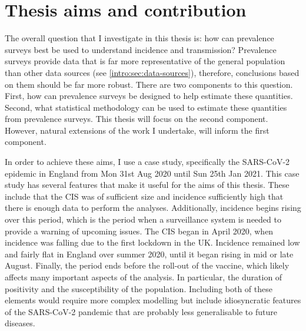 \documentclass[thesis.tex]{subfiles}
\begin{document}


\section{Thesis aims and contribution} \label{intro:sec:aims}

The overall question that I investigate in this thesis is: how can prevalence surveys best be used to understand incidence and transmission?
Prevalence surveys provide data that is far more representative of the general population than other data sources (see \cref{intro:sec:data-sources}), therefore, conclusions based on them should be far more robust.
There are two components to this question.
First, how can prevalence surveys be designed to help estimate these quantities.
Second, what statistical methodology can be used to estimate these quantities from prevalence surveys.
This thesis will focus on the second component.
However, natural extensions of the work I undertake, will inform the first component.

In order to achieve these aims, I use a case study, specifically the SARS-CoV-2 epidemic in England from Mon 31st Aug 2020 until Sun 25th Jan 2021.
This case study has several features that make it useful for the aims of this thesis.
These include that the CIS was of sufficient size and incidence sufficiently high that there is enough data to perform the analyses.
Additionally, incidence begins rising over this period, which is the period when a surveillance system is needed to provide a warning of upcoming issues.
The CIS began in April 2020, when incidence was falling due to the first lockdown in the UK.
Incidence remained low and fairly flat in England over summer 2020, until it began rising in mid or late August.
Finally, the period ends before the roll-out of the vaccine, which likely affects many important aspects of the analysis.
In particular, the duration of positivity and the susceptibility of the population.
Including both of these elements would require more complex modelling but include idiosyncratic features of the SARS-CoV-2 pandemic that are probably less generalisable to future diseases.
\end{document}
